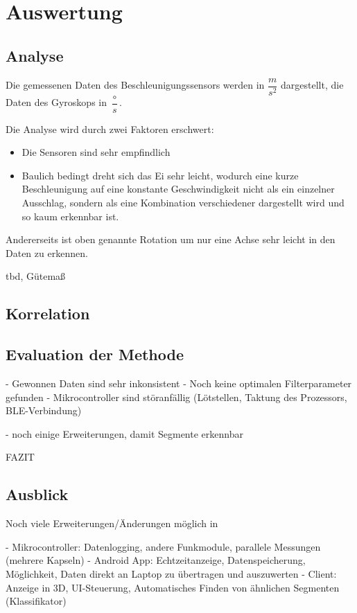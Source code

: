 \section{Auswertung}
\subsection{Analyse}
Die gemessenen Daten des Beschleunigungssensors werden in $\dfrac{m}{s^{2}}$ 
dargestellt, die Daten des Gyroskops in $\dfrac{\circ}{s}$.

Die Analyse wird durch zwei Faktoren erschwert:
\begin{itemize}
	\item Die Sensoren sind sehr empfindlich
	\item Baulich bedingt dreht sich das Ei sehr leicht, wodurch eine kurze Beschleunigung auf eine konstante Geschwindigkeit nicht als ein einzelner Ausschlag, sondern als eine Kombination verschiedener dargestellt wird und so kaum erkennbar ist.
\end{itemize}
Andererseits ist oben genannte Rotation um nur eine Achse sehr leicht in den Daten zu erkennen.

tbd,  Gütemaß

\subsection{Korrelation}


\subsection{Evaluation der Methode}
 
- Gewonnen Daten sind sehr inkonsistent
- Noch keine optimalen Filterparameter gefunden
- Mikrocontroller sind störanfällig (Lötstellen, Taktung des Prozessors, BLE-Verbindung)

- noch einige Erweiterungen, damit Segmente erkennbar

FAZIT

\subsection{Ausblick}

Noch viele Erweiterungen/Änderungen möglich in

- Mikrocontroller: Datenlogging, andere Funkmodule, parallele Messungen (mehrere Kapseln)
- Android App: Echtzeitanzeige, Datenspeicherung, Möglichkeit, Daten direkt an Laptop zu übertragen und auszuwerten
- Client: Anzeige in 3D, UI-Steuerung, Automatisches Finden von ähnlichen Segmenten (Klassifikator)

